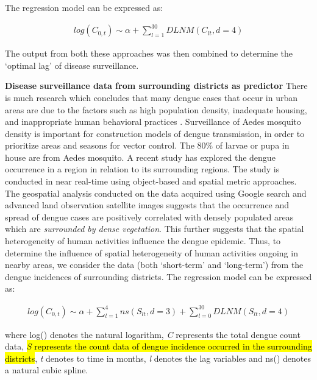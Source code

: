 \documentclass{bmcart}
\begin{document}
The regression model can be expressed as:

\begin{equation}
\begin{aligned}
\label{eq:long}
log (C_{0,t}) \sim \alpha + \sum_{l=1}^{30} DLNM(C_ {lt}, d = 4) 
\end{aligned}
\end{equation}


The output from both these approaches was then combined to determine the `optimal lag' of disease surveillance. 

\textbf{Disease surveillance data from surrounding districts as predictor} There is much research which concludes that many dengue cases that occur in urban areas are due to the factors such as high population density, inadequate housing, and inappropriate human behavioral practices \cite{chang2009combining,knudsen1992vector,troyo2009urban}.  Surveillance of Aedes mosquito density is important for construction models of dengue transmission, in order to prioritize areas and seasons for vector control. The 80\% of larvae or pupa in house are from Aedes mosquito. A recent study \cite{sarfraz2014near} has explored the dengue occurrence in a region in relation to its surrounding regions. The study is conducted in near real-time using object-based and spatial metric approaches. The geospatial analysis conducted on the data acquired using Google search and advanced land observation satellite images suggests that the occurrence and spread of dengue cases are positively correlated with densely populated areas which are \textit{surrounded by dense vegetation}. This further suggests that the spatial heterogeneity of human activities influence the dengue epidemic. Thus, to determine the influence of spatial heterogeneity of human activities ongoing in nearby areas, we consider the data (both `short-term' and `long-term') from the dengue incidences of surrounding districts. The regression model can be expressed as:

\begin{equation}
\begin{aligned}
\label{eq:surrounding}
log (C_{0,t}) \sim \alpha  +  \sum_{l=1}^{4} ns(S_ {lt}, d =3) + \sum_{l=0}^{30} DLNM(S_ {lt}, d = 4) 
\end{aligned}
\end{equation}


where log() denotes the natural logarithm, \textit{C} represents the total dengue count data, \hl{\textit{S} represents the count data of dengue incidence occurred in the surrounding districts}, \textit{t} denotes to time in months, \textit{l} denotes the lag variables and ns() denotes a natural cubic spline. \\
\end{document}
